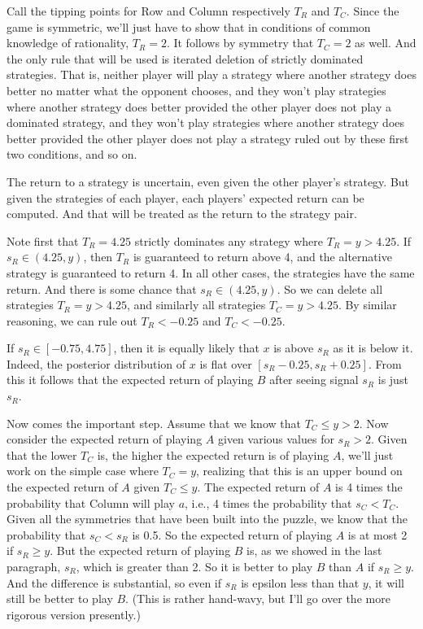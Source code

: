 \documentclass[11pt,]{book}
\begin{document}
Call the tipping points for Row and Column respectively \(T_R\) and \(T_C\). Since the game is symmetric, we'll just have to show that in conditions of common knowledge of rationality, \(T_R = 2\). It follows by symmetry that \(T_C = 2\) as well. And the only rule that will be used is iterated deletion of strictly dominated strategies. That is, neither player will play a strategy where another strategy does better no matter what the opponent chooses, and they won't play strategies where another strategy does better provided the other player does not play a dominated strategy, and they won't play strategies where another strategy does better provided the other player does not play a strategy ruled out by these first two conditions, and so on.

The return to a strategy is uncertain, even given the other player's strategy. But given the strategies of each player, each players' expected return can be computed. And that will be treated as the return to the strategy pair.

Note first that \(T_R = 4.25\) strictly dominates any strategy where \(T_R = y > 4.25\). If \(s_R \in (4.25, y)\), then \(T_R\) is guaranteed to return above 4, and the alternative strategy is guaranteed to return 4. In all other cases, the strategies have the same return. And there is some chance that \(s_R \in (4.25, y)\). So we can delete all strategies \(T_R = y > 4.25\), and similarly all strategies \(T_C = y > 4.25\). By similar reasoning, we can rule out \(T_R < -0.25\) and \(T_C < -0.25\).

If \(s_R \in [-0.75, 4.75]\), then it is equally likely that \(x\) is above \(s_R\) as it is below it. Indeed, the posterior distribution of \(x\) is flat over \([s_R - 0.25, s_R + 0.25]\). From this it follows that the expected return of playing \(B\) after seeing signal \(s_R\) is just \(s_R\).

Now comes the important step. Assume that we know that \(T_C \leq y > 2\). Now consider the expected return of playing \(A\) given various values for \(s_R > 2\). Given that the lower \(T_C\) is, the higher the expected return is of playing \(A\), we'll just work on the simple case where \(T_C = y\), realizing that this is an upper bound on the expected return of \(A\) given \(T_C \leq y\). The expected return of \(A\) is 4 times the probability that Column will play \(a\), i.e., 4 times the probability that \(s_C < T_C\). Given all the symmetries that have been built into the puzzle, we know that the probability that \(s_C < s_R\) is 0.5. So the expected return of playing \(A\) is at most 2 if \(s_R \geq y\). But the expected return of playing \(B\) is, as we showed in the last paragraph, \(s_R\), which is greater than 2. So it is better to play \(B\) than \(A\) if \(s_R \geq y\). And the difference is substantial, so even if \(s_R\) is epsilon less than that \(y\), it will still be better to play \(B\). (This is rather hand-wavy, but I'll go over the more rigorous version presently.)
\end{document}
